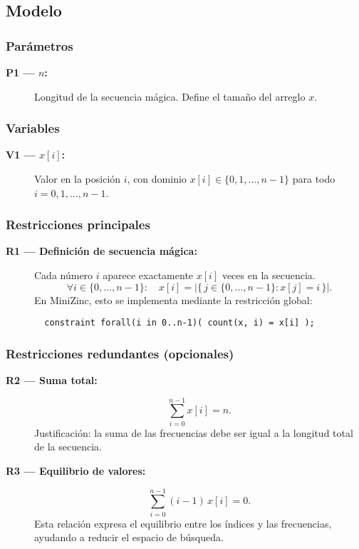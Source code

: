 

\subsection{Modelo}\label{sec:01-secuencias-magicas-modelo}

\subsubsection*{Parámetros}
\begin{description}
  \item[\textbf{P1 — \(n\):}] Longitud de la secuencia mágica. Define el tamaño del arreglo \(x\).
\end{description}

\subsubsection*{Variables}
\begin{description}
  \item[\textbf{V1 — \(x[i]\):}] Valor en la posición \(i\), con dominio \(x[i] \in \{0, 1, \dots, n-1\}\) para todo \(i = 0, 1, \dots, n-1\).
\end{description}

\subsubsection*{Restricciones principales}
\begin{description}
  \item[\textbf{R1 — Definición de secuencia mágica:}] Cada número \(i\) aparece exactamente \(x[i]\) veces en la secuencia. 
  \[
  \forall i \in \{0, \dots, n-1\}:\quad x[i] = \bigl|\{\, j \in \{0, \dots, n-1\} : x[j] = i \,\}\bigr|.
  \]
  En MiniZinc, esto se implementa mediante la restricción global:
  \begin{verbatim}
  constraint forall(i in 0..n-1)( count(x, i) = x[i] );
  \end{verbatim}
\end{description}

\subsubsection*{Restricciones redundantes (opcionales)}
\begin{description}
  \item[\textbf{R2 — Suma total:}]
  \[
  \sum_{i=0}^{n-1} x[i] = n.
  \]
  Justificación: la suma de las frecuencias debe ser igual a la longitud total de la secuencia.

  \item[\textbf{R3 — Equilibrio de valores:}]
  \[
  \sum_{i=0}^{n-1} (i-1)\,x[i] = 0.
  \]
  Esta relación expresa el equilibrio entre los índices y las frecuencias, ayudando a reducir el espacio de búsqueda.
\end{description}